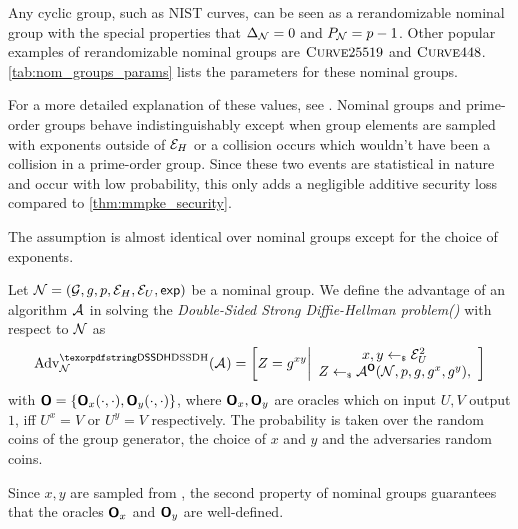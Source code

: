 Any cyclic group, such as NIST curves, can be seen as a rerandomizable nominal group with the special properties that $\Delta_\mathcal{N} =
0$ and $P_\mathcal{N} = p-1$. Other popular examples of rerandomizable nominal groups are $\textsc{Curve}25519$ and
$\textsc{Curve}448$. \cref{tab:nom_groups_params} lists the parameters for these nominal groups.

For a more detailed explanation of these values, see \cite{EC:ABHKLR21_2}. Nominal groups and prime-order
groups behave indistinguishably except when group elements are sampled with exponents outside of $\mathcal{E}_H$ or a collision
occurs which wouldn't have been a collision in a prime-order group. Since these two events are statistical in nature and
occur with low probability, this only adds a negligible additive security loss compared to \cref{thm:mmpke_security}.

The \sdh assumption is almost identical over nominal groups except for the choice of exponents.
\begin{definition}
  Let $\mathcal{N} = (\mathcal{G}, g, p, \mathcal{E}_H, \mathcal{E}_U, \textnormal{\sf exp})$ be a nominal group. We define the advantage of an
  algorithm $\mathcal{A}_{\relax}$ in solving the \emph{Double-Sided Strong Diffie-Hellman problem(\sdh)} with respect to $\mathcal{N}$ as
  \[
    \adv{\sdh}{\ngroup}(\Adv) =
    \left[
      Z = g^{xy}
      \middle\vert
      \begin{array}{c}
        x, y \getsr \nGU^2\\
        Z \getsr \Adv^{\oracle{O}}(\ngroup,p,g,g^x,g^y),
      \end{array}
    \right]
  \]
with $\textnormal{\textsf{\bfseries O}} = \{\textnormal{\textsf{\bfseries O}}_x(\cdot,\cdot),\textnormal{\textsf{\bfseries O}}_y(\cdot,\cdot)\}$, where $\textnormal{\textsf{\bfseries O}}_x,\textnormal{\textsf{\bfseries O}}_y$ are oracles which on input $U,V$ output $1$, iff $U^x = V$ or $U^y = V$ respectively.
The probability is taken over the random coins of the group generator, the choice of $x$ and $y$ and the adversaries
random coins.
\end{definition}

\begin{remark}
  Since $x,y$ are sampled from \nGU, the second property of nominal groups guarantees that the oracles $\textnormal{\textsf{\bfseries O}}_x$
  and $\textnormal{\textsf{\bfseries O}}_y$ are well-defined.
\end{remark}

